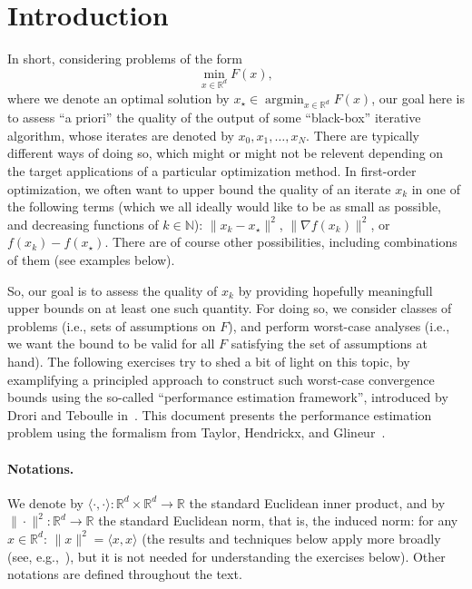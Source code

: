 \documentclass[11pt,a4paper]{article}
\newcommand{\inner}[2]{{\langle #1, #2\rangle}}
\DeclareMathOperator*{\argmin}{argmin}
\begin{document}
	\clearpage
	\section{Introduction}			%
	
	In short, considering problems of the form \[\min_{x\in\mathbb{R}^d} F(x),\] where we denote an optimal solution by $x_\star\in\argmin_{x\in\mathbb{R}^d} F(x)$, our goal here is to assess ``a priori'' the quality of the output of some ``black-box'' iterative algorithm, whose iterates are denoted by $x_0,x_1,\ldots,x_N$. There are typically different ways of doing so, which might or might not be relevent depending on the target applications of a particular optimization method. In first-order optimization, we often want to upper bound the quality of an iterate $x_k$ in one of the following terms (which we all ideally would like to be as small as possible, and decreasing functions of $k\in\mathbb{N}$): $\|x_k-x_\star\|^2$, $\|\nabla f(x_k)\|^2$, or $f(x_k)-f(x_\star)$. There are of course other possibilities, including combinations of them (see examples below).

So, our goal is to assess the quality of $x_k$ by providing hopefully meaningfull upper bounds on at least one such quantity. For doing so, we consider classes of problems (i.e., sets of assumptions on $F$), and perform worst-case analyses (i.e., we want the bound to be valid for all $F$ satisfying the set of assumptions at hand). The following exercises try to shed a bit of light on this topic, by examplifying a principled approach to construct such worst-case convergence bounds using the so-called ``performance estimation framework'', introduced by Drori and Teboulle in~\cite{drori2014performance}. This document presents the performance estimation problem using the formalism from Taylor, Hendrickx, and Glineur~\cite{taylor2015exact,taylor2015smooth}.

\paragraph{Notations.} We denote by $\inner{\cdot}{\cdot}:\mathbb{R}^d\times \mathbb{R}^d\rightarrow\mathbb{R} $ the standard Euclidean inner product, and by $\|\cdot \|^2:\mathbb{R}^d\rightarrow\mathbb{R}$ the standard Euclidean norm, that is, the induced norm: for any $x\in\mathbb{R}^d$: $\|x\|^2=\inner{x}{x}$ (the results and techniques below apply more broadly (see, e.g.,~\cite{taylor2015exact,Dragomir2019optimal}), but it is not needed for understanding the exercises below). Other notations are defined throughout the text.
\end{document}
